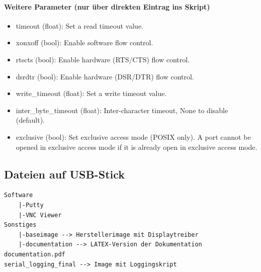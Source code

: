 \documentclass{article}
\begin{document}
\paragraph{Weitere Parameter (nur über direkten Eintrag ins Skript)} 
\begin{itemize}
	\item timeout (float): Set a read timeout value.
    \item xonxoff (bool): Enable software flow control.
    \item rtscts (bool): Enable hardware (RTS/CTS) flow control.
    \item dsrdtr (bool): Enable hardware (DSR/DTR) flow control.
    \item write\_timeout (float): Set a write timeout value.
    \item inter\_byte\_timeout (float): Inter-character timeout, None to disable (default).
    \item exclusive (bool): Set exclusive access mode (POSIX only). A port cannot be opened in exclusive access mode if it is already open in exclusive access mode.
\end{itemize}

\subsection{Dateien auf USB-Stick}
\begin{lstlisting}
Software
	|-Putty
	|-VNC Viewer
Sonstiges
	|-baseimage --> Herstellerimage mit Displaytreiber
	|-documentation --> LATEX-Version der Dokumentation
documentation.pdf
serial_logging_final --> Image mit Loggingskript
\end{lstlisting}
\end{document}
